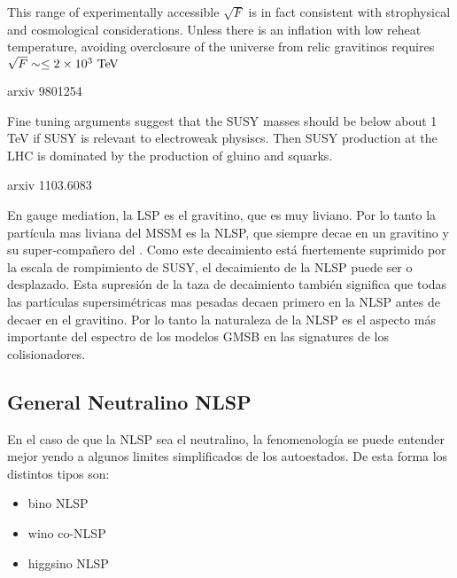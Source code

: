 This range of experimentally accessible $\sqrt{F}$ is in fact consistent with strophysical and cosmological considerations. Unless there is an inflation with low
reheat temperature, avoiding overclosure of the universe from relic gravitinos requires $\sqrt{F} \sim \leq 2 \times 10^3 \tev$






arxiv 9801254

Fine tuning arguments suggest that the SUSY masses should be below about 1 TeV if SUSY is relevant to electroweak physiscs.
Then SUSY production at the LHC is dominated by the production of gluino and squarks.

arxiv 1103.6083


En gauge mediation, la LSP es el gravitino, que es muy liviano. Por lo tanto la partícula mas liviana
del MSSM es la NLSP, que siempre decae en un gravitino y su super-compa\~nero del {\SM}. Como este
decaimiento está fuertemente suprimido por la escala de rompimiento de SUSY, el decaimiento de la NLSP
puede ser  o desplazado. Esta supresión de la taza de decaimiento también significa que todas las
partículas supersimétricas mas pesadas decaen primero en la NLSP antes de decaer en el gravitino. Por lo
tanto la naturaleza de la NLSP es el aspecto más importante del espectro de los modelos GMSB en las signatures
de los colisionadores.


\subsection{General Neutralino NLSP}

En el caso de que la NLSP sea el neutralino, la fenomenolog\'ia se puede entender mejor yendo a
algunos limites simplificados de los autoestados. De esta forma los distintos tipos son:

\begin{itemize}
\item bino NLSP
\item wino co-NLSP
\item higgsino NLSP
\end{itemize}

